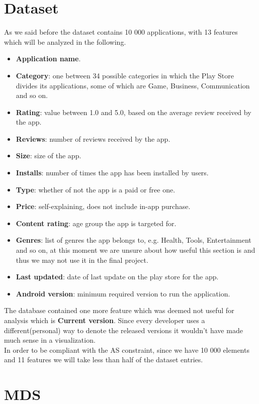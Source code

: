 \documentclass[a4paper, 11pt]{article}
\begin{document}
\section{Dataset}
As we said before the dataset contains 10 000 applications, with 13 features which will be analyzed in the following.
\begin{itemize}
\item \textbf{Application name}.
\item \textbf{Category}: one between 34 possible categories in which the Play Store divides its applications, some of which are Game, Business, Communication and so on.
\item \textbf{Rating}: value between 1.0 and 5.0, based on the average review received by the app.
\item \textbf{Reviews}: number of reviews received by the app.
\item \textbf{Size}: size of the app.
\item \textbf{Installs}: number of times the app has been installed by users.
\item \textbf{Type}: whether of not the app is a paid or free one.
\item \textbf{Price}: self-explaining, does not include in-app purchase.
\item \textbf{Content rating}: age group the app is targeted for.
\item \textbf{Genres}: list of genres the app belongs to, e.g. Health, Tools, Entertainment and so on, at this moment we are unsure about how useful this section is and thus we may not use it in the final project.
\item \textbf{Last updated}: date of last update on the play store for the app.
\item \textbf{Android version}: minimum required version to run the application.
\end{itemize}
The database contained one more feature which was deemed not useful for analysis which is \textbf{Current version}. Since every developer uses a different(personal) way to denote the released versions it wouldn't have made much sense in a visualization.\\
In order to be compliant with the AS constraint, since we have 10 000 elements and 11 features we will take less than half of the dataset entries.

\section{MDS}
\end{document}
